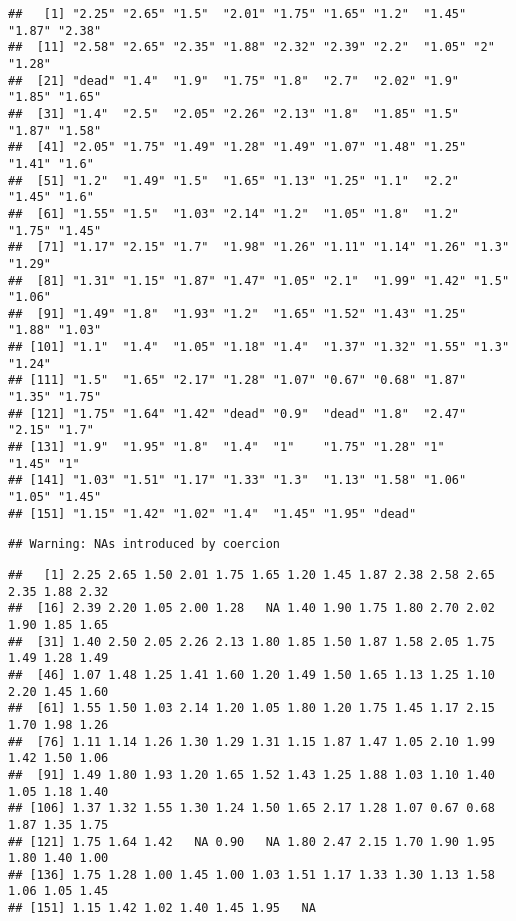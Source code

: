 \documentclass[
]{article}
\newenvironment{Shaded}{\begin{snugshade}}{\end{snugshade}}
\newcommand{\FunctionTok}[1]{\textcolor[rgb]{0.00,0.00,0.00}{#1}}
\newcommand{\NormalTok}[1]{#1}
\newcommand{\SpecialCharTok}[1]{\textcolor[rgb]{0.00,0.00,0.00}{#1}}
\begin{document}
\begin{verbatim}
##   [1] "2.25" "2.65" "1.5"  "2.01" "1.75" "1.65" "1.2"  "1.45" "1.87" "2.38"
##  [11] "2.58" "2.65" "2.35" "1.88" "2.32" "2.39" "2.2"  "1.05" "2"    "1.28"
##  [21] "dead" "1.4"  "1.9"  "1.75" "1.8"  "2.7"  "2.02" "1.9"  "1.85" "1.65"
##  [31] "1.4"  "2.5"  "2.05" "2.26" "2.13" "1.8"  "1.85" "1.5"  "1.87" "1.58"
##  [41] "2.05" "1.75" "1.49" "1.28" "1.49" "1.07" "1.48" "1.25" "1.41" "1.6" 
##  [51] "1.2"  "1.49" "1.5"  "1.65" "1.13" "1.25" "1.1"  "2.2"  "1.45" "1.6" 
##  [61] "1.55" "1.5"  "1.03" "2.14" "1.2"  "1.05" "1.8"  "1.2"  "1.75" "1.45"
##  [71] "1.17" "2.15" "1.7"  "1.98" "1.26" "1.11" "1.14" "1.26" "1.3"  "1.29"
##  [81] "1.31" "1.15" "1.87" "1.47" "1.05" "2.1"  "1.99" "1.42" "1.5"  "1.06"
##  [91] "1.49" "1.8"  "1.93" "1.2"  "1.65" "1.52" "1.43" "1.25" "1.88" "1.03"
## [101] "1.1"  "1.4"  "1.05" "1.18" "1.4"  "1.37" "1.32" "1.55" "1.3"  "1.24"
## [111] "1.5"  "1.65" "2.17" "1.28" "1.07" "0.67" "0.68" "1.87" "1.35" "1.75"
## [121] "1.75" "1.64" "1.42" "dead" "0.9"  "dead" "1.8"  "2.47" "2.15" "1.7" 
## [131] "1.9"  "1.95" "1.8"  "1.4"  "1"    "1.75" "1.28" "1"    "1.45" "1"   
## [141] "1.03" "1.51" "1.17" "1.33" "1.3"  "1.13" "1.58" "1.06" "1.05" "1.45"
## [151] "1.15" "1.42" "1.02" "1.4"  "1.45" "1.95" "dead"
\end{verbatim}

\begin{Shaded}
\end{Shaded}

\begin{verbatim}
## Warning: NAs introduced by coercion
\end{verbatim}

\begin{verbatim}
##   [1] 2.25 2.65 1.50 2.01 1.75 1.65 1.20 1.45 1.87 2.38 2.58 2.65 2.35 1.88 2.32
##  [16] 2.39 2.20 1.05 2.00 1.28   NA 1.40 1.90 1.75 1.80 2.70 2.02 1.90 1.85 1.65
##  [31] 1.40 2.50 2.05 2.26 2.13 1.80 1.85 1.50 1.87 1.58 2.05 1.75 1.49 1.28 1.49
##  [46] 1.07 1.48 1.25 1.41 1.60 1.20 1.49 1.50 1.65 1.13 1.25 1.10 2.20 1.45 1.60
##  [61] 1.55 1.50 1.03 2.14 1.20 1.05 1.80 1.20 1.75 1.45 1.17 2.15 1.70 1.98 1.26
##  [76] 1.11 1.14 1.26 1.30 1.29 1.31 1.15 1.87 1.47 1.05 2.10 1.99 1.42 1.50 1.06
##  [91] 1.49 1.80 1.93 1.20 1.65 1.52 1.43 1.25 1.88 1.03 1.10 1.40 1.05 1.18 1.40
## [106] 1.37 1.32 1.55 1.30 1.24 1.50 1.65 2.17 1.28 1.07 0.67 0.68 1.87 1.35 1.75
## [121] 1.75 1.64 1.42   NA 0.90   NA 1.80 2.47 2.15 1.70 1.90 1.95 1.80 1.40 1.00
## [136] 1.75 1.28 1.00 1.45 1.00 1.03 1.51 1.17 1.33 1.30 1.13 1.58 1.06 1.05 1.45
## [151] 1.15 1.42 1.02 1.40 1.45 1.95   NA
\end{verbatim}
\end{document}
